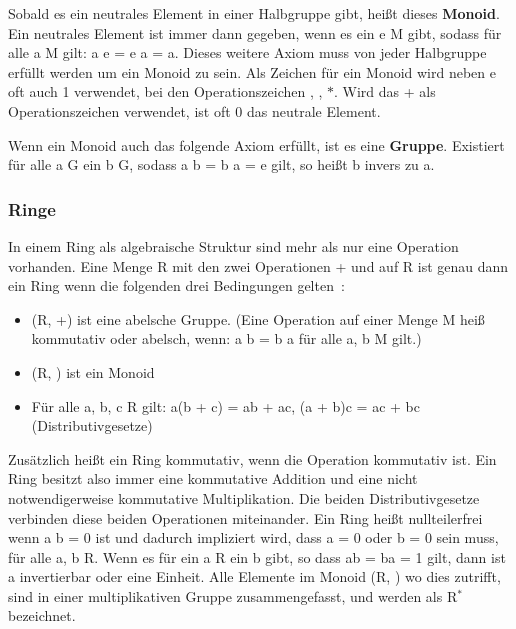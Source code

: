 			\wup Sobald es ein neutrales Element in einer Halbgruppe gibt, heißt dieses \textbf{Monoid}. Ein neutrales Element ist immer dann gegeben, wenn es ein e \myin M gibt, sodass für alle a \myin M gilt: a \mycirc e = e \mycirc a = a. Dieses weitere Axiom muss von jeder Halbgruppe erfüllt werden um ein Monoid zu sein. Als Zeichen für ein Monoid wird neben e oft auch 1 verwendet, bei den Operationszeichen \mycircOhne, \mycdotOhne, $*$. Wird das + als Operationszeichen verwendet, ist oft 0 das neutrale Element.~\cite{Erste:Hilfe:in:Linearer:Algebra}
			
			\wup Wenn ein Monoid auch das folgende Axiom erfüllt, ist es eine \textbf{Gruppe}. Existiert für alle a \myin G ein b \myin G, sodass a \mycirc b = b \mycirc a = e gilt, so heißt b invers zu a.~\cite{Erste:Hilfe:in:Linearer:Algebra}
			
		\subsubsection*{Ringe}
			In einem Ring als algebraische Struktur sind mehr als nur eine Operation vorhanden. Eine Menge R mit den zwei Operationen + und \mycdot auf R ist genau dann ein Ring wenn die folgenden drei Bedingungen gelten~\cite{Erste:Hilfe:in:Linearer:Algebra}:
			
			\begin{itemize}
				\item (R, +) ist eine abelsche Gruppe. (Eine Operation \mycirc auf einer Menge M heiß kommutativ oder abelsch, wenn: a \mycirc b = b \mycirc a für alle a, b \myin M gilt.)
				\item (R, \mycdotOhne) ist ein Monoid
				\item Für alle a, b, c \myin R gilt: a(b + c) = ab + ac, (a + b)c = ac + bc (Distributivgesetze)
			\end{itemize}
			
			\wup Zusätzlich heißt ein Ring kommutativ, wenn die Operation \mycdot kommutativ ist. Ein Ring besitzt also immer eine kommutative Addition und eine nicht notwendigerweise kommutative Multiplikation. Die beiden Distributivgesetze verbinden diese beiden Operationen miteinander. Ein Ring heißt nullteilerfrei wenn a \mycdot b = 0 ist und dadurch impliziert wird, dass a = 0 oder b = 0 sein muss, für alle a, b \myin R. Wenn es für ein a \myin R ein b gibt, so dass ab = ba = 1 gilt, dann ist a invertierbar oder eine Einheit. Alle Elemente im Monoid (R, \mycdotOhne) wo dies zutrifft, sind in einer multiplikativen Gruppe zusammengefasst, und werden als R$^*$ bezeichnet.~\cite{Erste:Hilfe:in:Linearer:Algebra}
			
